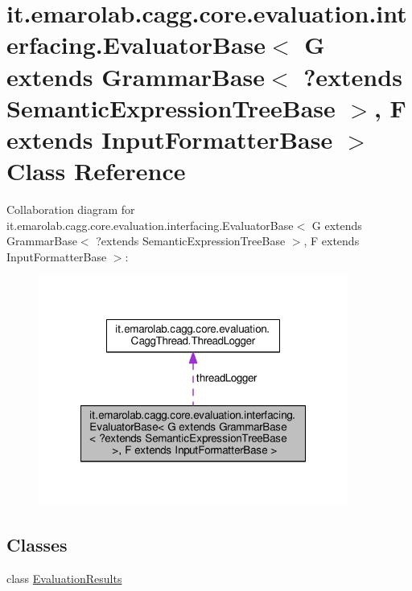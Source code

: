 \hypertarget{classit_1_1emarolab_1_1cagg_1_1core_1_1evaluation_1_1interfacing_1_1EvaluatorBase_3_01G_01extendd61d057930241954f97ab0cbf4992dd1}{\section{it.\-emarolab.\-cagg.\-core.\-evaluation.\-interfacing.\-Evaluator\-Base$<$ G extends Grammar\-Base$<$ ?extends Semantic\-Expression\-Tree\-Base $>$, F extends Input\-Formatter\-Base $>$ Class Reference}
\label{classit_1_1emarolab_1_1cagg_1_1core_1_1evaluation_1_1interfacing_1_1EvaluatorBase_3_01G_01extendd61d057930241954f97ab0cbf4992dd1}
}


Collaboration diagram for it.\-emarolab.\-cagg.\-core.\-evaluation.\-interfacing.\-Evaluator\-Base$<$ G extends Grammar\-Base$<$ ?extends Semantic\-Expression\-Tree\-Base $>$, F extends Input\-Formatter\-Base $>$\-:\nopagebreak
\begin{figure}[H]
\begin{center}
\leavevmode
\includegraphics[width=288pt]{classit_1_1emarolab_1_1cagg_1_1core_1_1evaluation_1_1interfacing_1_1EvaluatorBase_3_01G_01extendc8c01e11698ab0d4aed93d88347cbae3}
\end{center}
\end{figure}
\subsection*{Classes}
\begin{DoxyCompactItemize}
\item 
class \hyperlink{classit_1_1emarolab_1_1cagg_1_1core_1_1evaluation_1_1interfacing_1_1EvaluatorBase_3_01G_01extend2adbebed3b043f34edcb0efa646badc7}{Evaluation\-Results}
\end{DoxyCompactItemize}
